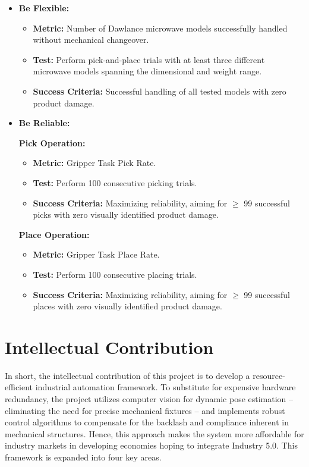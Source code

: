 \begin{itemize}
    \item \textbf{Be Flexible:}
    \begin{itemize}
        \item \textbf{Metric:} Number of Dawlance microwave models successfully handled without mechanical changeover.
        \item \textbf{Test:} Perform pick-and-place trials with at least three different microwave models spanning the dimensional and weight range.
        \item \textbf{Success Criteria:} Successful handling of all tested models with zero product damage.
    \end{itemize}

    \item \textbf{Be Reliable:}
    
    \textbf{Pick Operation:}
    \begin{itemize}
        \item \textbf{Metric:} Gripper Task Pick Rate.
        \item \textbf{Test:} Perform 100 consecutive picking trials.
        \item \textbf{Success Criteria:} Maximizing reliability, aiming for $\ge$ 99 successful picks with zero visually identified product damage.
    \end{itemize}
        
    \textbf{Place Operation:}
    \begin{itemize}
        \item \textbf{Metric:} Gripper Task Place Rate.
        \item \textbf{Test:} Perform 100 consecutive placing trials.
        \item \textbf{Success Criteria:} Maximizing reliability, aiming for $\ge$ 99 successful places with zero visually identified product damage.
    \end{itemize}

\end{itemize}

\section{Intellectual Contribution}

In short, the intellectual contribution of this project is to develop a resource-efficient industrial automation framework. To substitute for expensive hardware redundancy, the project utilizes computer vision for dynamic pose estimation -- eliminating the need for precise mechanical fixtures -- and implements robust control algorithms to compensate for the backlash and compliance inherent in mechanical structures. Hence, this approach makes the system more affordable for industry markets in developing economies hoping to integrate Industry 5.0. This framework is expanded into four key areas.

